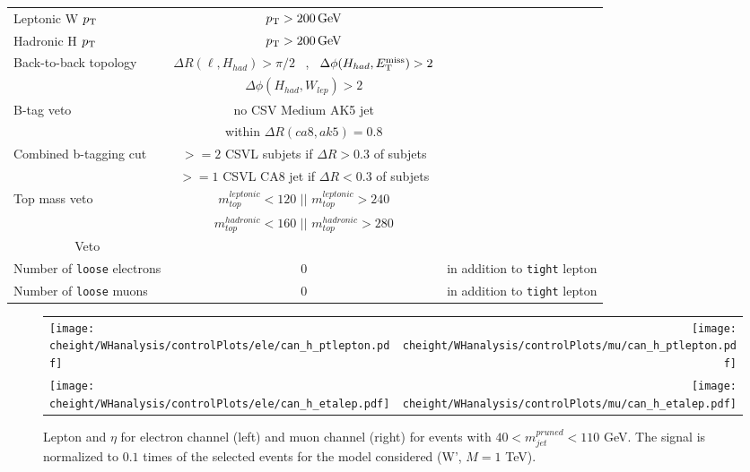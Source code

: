 \begin{table}[htb]
\begin{center}
\begin{tabular}{lcc}
Leptonic W $p_{\mathrm{T}}$      &  $p_{\mathrm{T}} > 200 \,\text{Ge\hspace{-.08em}V}$ & \\
Hadronic H $p_{\mathrm{T}}$      &  $p_{\mathrm{T}} > 200 \,\text{Ge\hspace{-.08em}V}$ & \\
Back-to-back topology & $\Delta R (\ell , H_{had}) > \pi/2$ $\,$ , $\,$  $\Delta \phi (H_{had} , \mbox{\ensuremath{E_{\mathrm{T}}^{\text{miss}}}})>2$ & \\
                      & $\Delta \phi (H_{had} , W_{lep})>2$ & \\
B-tag veto      & no CSV Medium AK5 jet &  \\
		& within $\Delta R (ca8, ak5) = 0.8$ &  \\
Combined b-tagging cut	& $>= 2$ CSVL subjets if $\Delta R > 0.3$ of subjets & \\
			& $>= 1$ CSVL CA8 jet if $\Delta R < 0.3$ of subjets & \\ 
Top mass veto	& $ m_{top}^{leptonic} < 120 $ $||$ $ m_{top}^{leptonic} > 240 $ & \\
		& $ m_{top}^{hadronic} < 160 $ $||$ $ m_{top}^{hadronic} > 280 $ & \\
\hline
\multicolumn{1}{c}{Veto}\\
\cline{1-1}
Number of \texttt{loose} electrons & 0 & in addition to \texttt{tight} lepton \\
Number of \texttt{loose} muons & 0 & in addition to \texttt{tight} lepton \\
\end{tabular}
\end{center}
\end{table}

\begin{figure}[h!bp]
\centering
\begin{tabular}{lr}
\texttt{[image: \\cheight/WHanalysis/controlPlots/ele/can\_h\_ptlepton.pdf]} &
\texttt{[image: \\cheight/WHanalysis/controlPlots/mu/can\_h\_ptlepton.pdf]} \\
\texttt{[image: \\cheight/WHanalysis/controlPlots/ele/can\_h\_etalep.pdf]} &
\texttt{[image: \\cheight/WHanalysis/controlPlots/mu/can\_h\_etalep.pdf]} \\
\end{tabular}
\caption{ Lepton \pt and $\eta$ for electron channel (left) and muon channel (right) for events with $40 < m_{jet}^{pruned} < 110$ GeV. The signal is normalized to $0.1$ times of the selected events for the model considered (W', $M=1$ TeV).}
\label{fig:controlPlotsLepPtEta}
\end{figure}

